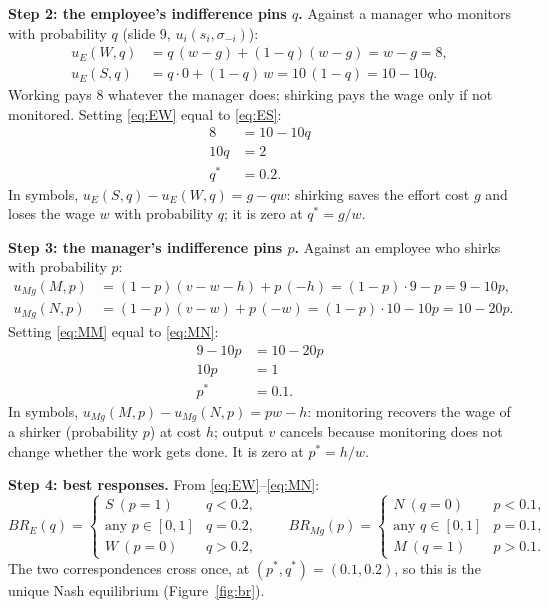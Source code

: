 \documentclass[11pt,a4paper]{article}
\begin{document}
\textbf{Step 2: the employee's indifference pins $q$.} Against a manager who monitors with
probability $q$ (slide 9, $u_i(s_i, \sigma_{-i})$):
\begin{align}
  u_E(W, q) &= q\,(w - g) + (1 - q)(w - g) = w - g = 8, \label{eq:EW}\\
  u_E(S, q) &= q \cdot 0 + (1 - q)\, w = 10\,(1 - q) = 10 - 10q. \label{eq:ES}
\end{align}
Working pays $8$ whatever the manager does; shirking pays the wage only if not monitored. Setting
\eqref{eq:EW} equal to \eqref{eq:ES}:
\begin{align*}
  8 &= 10 - 10q\\
  10q &= 2\\
  q^* &= 0.2.
\end{align*}
In symbols, $u_E(S, q) - u_E(W, q) = g - q w$: shirking saves the effort cost $g$ and loses the wage
$w$ with probability $q$; it is zero at $q^* = g/w$.

\textbf{Step 3: the manager's indifference pins $p$.} Against an employee who shirks with
probability $p$:
\begin{align}
  u_{M\!g}(M, p) &= (1 - p)(v - w - h) + p\,(-h) = (1 - p)\cdot 9 - p = 9 - 10p, \label{eq:MM}\\
  u_{M\!g}(N, p) &= (1 - p)(v - w) + p\,(-w) = (1 - p)\cdot 10 - 10p = 10 - 20p. \label{eq:MN}
\end{align}
Setting \eqref{eq:MM} equal to \eqref{eq:MN}:
\begin{align*}
  9 - 10p &= 10 - 20p\\
  10p &= 1\\
  p^* &= 0.1.
\end{align*}
In symbols, $u_{M\!g}(M, p) - u_{M\!g}(N, p) = p w - h$: monitoring recovers the wage of a shirker
(probability $p$) at cost $h$; output $v$ cancels because monitoring does not change whether the work
gets done. It is zero at $p^* = h/w$.

\textbf{Step 4: best responses.} From \eqref{eq:EW}--\eqref{eq:MN}:
\[
  BR_E(q) = \begin{cases} S\ (p = 1) & q < 0.2,\\ \text{any } p \in [0,1] & q = 0.2,\\
  W\ (p = 0) & q > 0.2, \end{cases}
  \qquad
  BR_{M\!g}(p) = \begin{cases} N\ (q = 0) & p < 0.1,\\ \text{any } q \in [0,1] & p = 0.1,\\
  M\ (q = 1) & p > 0.1. \end{cases}
\]
The two correspondences cross once, at $(p^*, q^*) = (0.1, 0.2)$, so this is the unique Nash
equilibrium (Figure~\ref{fig:br}).
\end{document}
